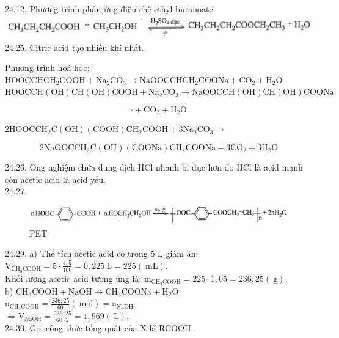 \documentclass[10pt]{article}
\begin{document}
24.12. Phương trình phản ứng điều chế ethyl butanoate:\\
\includegraphics[max width=\textwidth, center]{2025_10_23_ed7118e3280f74e91193g-39}\\
24.25. Citric acid tạo nhiều khí nhất.

Phương trình hoá học:\\
$\mathrm{HOOCCH} \mathrm{CH}_{2} \mathrm{COOH}+\mathrm{Na}_{2} \mathrm{CO}_{3} \rightarrow \mathrm{NaOOCCH} \mathrm{CH}_{2} \mathrm{COONa}+\mathrm{CO}_{2}+\mathrm{H}_{2} \mathrm{O}$\\
$\mathrm{HOOCCH}(\mathrm{OH}) \mathrm{CH}(\mathrm{OH}) \mathrm{COOH}+\mathrm{Na}_{2} \mathrm{CO}_{3} \rightarrow \mathrm{NaOOC} \mathrm{CH}(\mathrm{OH}) \mathrm{CH}(\mathrm{OH}) \mathrm{COONa}$

$$
\cdot+\mathrm{CO}_{2}+\mathrm{H}_{2} \mathrm{O}
$$

$2 \mathrm{HOOCCH}_{2} \mathrm{C}(\mathrm{OH})(\mathrm{COOH}) \mathrm{CH}_{2} \mathrm{COOH}+3 \mathrm{Na}_{2} \mathrm{CO}_{3} \rightarrow$

$$
2 \mathrm{NaOOCCH}_{2} \mathrm{C}(\mathrm{OH})(\mathrm{COONa}) \mathrm{CH}_{2} \mathrm{COONa}+3 \mathrm{CO}_{2}+3 \mathrm{H}_{2} \mathrm{O}
$$

24.26. Ong nghiệm chứa dung dịch HCl nhanh bị đục hơn do HCl là acid mạnh còn acetic acid là acid yếu.\\
24.27.

\begin{figure}[h]
\begin{center}
  \includegraphics[width=\textwidth]{2025_10_23_ed7118e3280f74e91193g-39(1)}
\captionsetup{labelformat=empty}
\caption{PET}
\end{center}
\end{figure}

24.29. a) Thể tích acetic acid có trong 5 L giấm ăn:\\
$\mathrm{V}_{\mathrm{CH}_{3} \mathrm{COOH}}=5 \cdot \frac{4,5}{100}=0,225 \mathrm{~L}=225(\mathrm{~mL})$.\\
Khối lượng acetic acid tương ứng là: $\mathrm{m}_{\mathrm{CH}_{3} \mathrm{COOH}}=225 \cdot 1,05=236,25(\mathrm{~g})$.\\
b) $\mathrm{CH}_{3} \mathrm{COOH}+\mathrm{NaOH} \rightarrow \mathrm{CH}_{3} \mathrm{COONa}+\mathrm{H}_{2} \mathrm{O}$\\
$\mathrm{n}_{\mathrm{CH}_{3} \mathrm{COOH}}=\frac{236,25}{60}(\mathrm{~mol})=\mathrm{n}_{\mathrm{NaOH}}$\\
$\Rightarrow \mathrm{V}_{\mathrm{NaOH}}=\frac{236,25}{60 \cdot 2}=1,969(\mathrm{~L})$.\\
24.30. Gọi công thức tổng quát của X là RCOOH .
\end{document}
